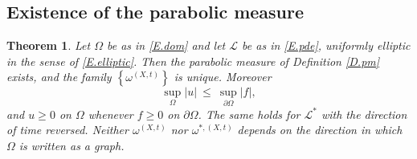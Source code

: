 \documentclass[10pt,a4paper]{amsart}
\numberwithin{equation}{section}
\newcommand{\abs}[1]{\left\vert#1\right\vert}
\newcommand{\set}[1]{\left\{#1\right\}}
\newcommand{\om}{\Omega}
\newcommand{\pom}{\partial\Omega}
\newcommand{\LL}{\mathcal L}
\newtheorem{theorem}[equation]{Theorem}
\begin{document}
\subsection{Existence of the parabolic measure}\label{ss.pmproof}

\begin{theorem}\label{T.pmeasure}
Let $\om$ be as in \eqref{E.dom} and let $\LL$ be as in \eqref{E.pde},
uniformly elliptic in the sense of \eqref{E.elliptic}. Then the parabolic
measure of Definition \ref{D.pm} exists, and the family
$\set{\omega^{(X,t)}}$ is unique. Moreover
\begin{equation}\label{E.maxpr}
  \sup_\om\abs u\ \le\ \sup_{\pom}\abs f ,
\end{equation}
and $u\ge0$ on $\om$ whenever $f\ge0$ on $\pom$. The same holds for $\LL^*$
with the direction of time reversed. Neither $\omega^{(X,t)}$ nor
$\omega^{*,(X,t)}$ depends on the direction in which $\om$ is written as a
graph.
\end{theorem}
\end{document}

